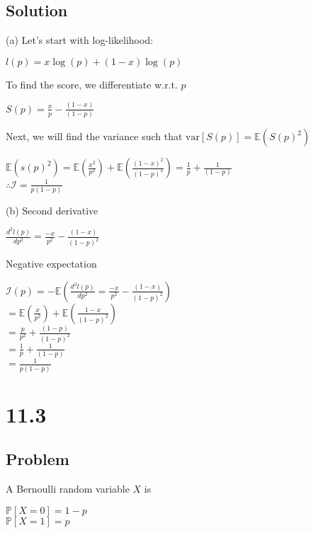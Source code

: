 \documentclass[10pt, a4paper]{article}
\newcommand{\PP}{\mathbb P}
\newcommand{\var}{\text{var}}
\begin{document}
\begin{*align}
    \subsection*{Solution}
      (a) Let's start with log-likelihood:
      \begin{center}
        $l(p) = x\log(p)+(1-x)\log(p)$
      \end{center}
      To find the score, we differentiate w.r.t. $p$
      \begin{center}
        $S(p)=\frac{x}{p}-\frac{(1-x)}{(1-p)}$
      \end{center}
      Next, we will find the variance such that $\var[S(p)]=\mathbb{E}(S(p)^2)$
      \begin{center}
        $\mathbb{E}(s(p)^2)=\mathbb{E}(\frac{x^2}{p^2})+\mathbb{E}(\frac{(1-x)^2}{(1-p)^2}) = \frac{1}{p}+\frac{1}{(1-p)}$\\
        $\boxed{\therefore \mathcal{I} = \frac{1}{p(1-p)}}$
      \end{center}
      (b) Second derivative 
      \begin{center}
        $\frac{d^2l(p)}{dp^2}=\frac{-x}{p^2}-\frac{(1-x)}{(1-p)^2}$ \\
      \end{center}
      Negative expectation
      \begin{center}
        $\mathcal{I}(p)=-\mathbb{E}(\frac{d^2l(p)}{dp^2}=\frac{-x}{p^2}-\frac{(1-x)}{(1-p)^2})$\\
        $ = \mathbb{E}(\frac{x}{p^2})+\mathbb{E}(\frac{1-x}{(1-p)^2})$ \\
        $ = \frac{p}{p^2}+\frac{(1-p)}{(1-p)^2}$ \\
        $ = \frac{1}{p}+\frac{1}{(1-p)}$ \\
        $\boxed{ = \frac{1}{p(1-p)}}$ 
      \end{center}
  \section*{11.3}
    \subsection*{Problem}
      A Bernoulli random variable $X$ is
      \begin{center}
        $\PP[X=0]=1-p$ \\
        $\PP[X=1]=p$ \\
      \end{center}


\end{*align}
\end{document}
